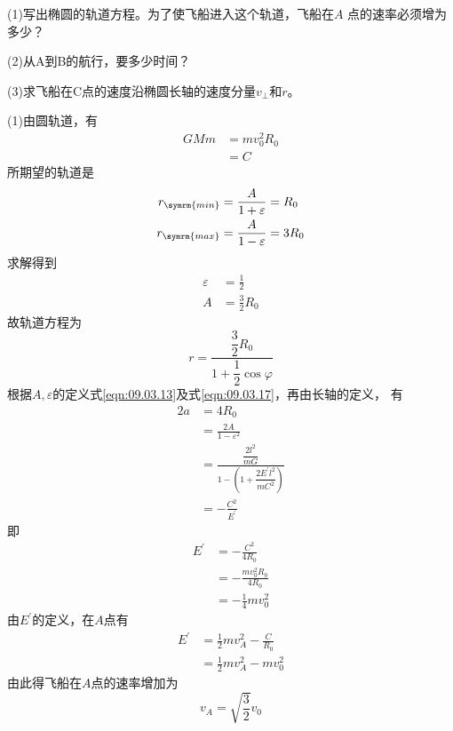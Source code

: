 (1)写出椭圆的轨道方程。为了使飞船进入这个轨道，飞船在$ A $
点的速率必须增为多少？

(2)从A到B的航行，要多少时间？


(3)求飞船在C点的速度沿椭圆长轴的速度分量$ v _ \bot $和$ \dot{ r } $。

\solution (1)由圆轨道，有
\begin{equation*}
  \begin{split}
    G M m &= m v _ 0 ^ { 2 } R _ { 0 } \\
    &= C
  \end{split}
\end{equation*}
所期望的轨道是
\begin{align*}
  r _ { \symrm{ min } } & = \frac { A } { 1 + \varepsilon } = R _ { 0 }   \\
  r _ { \symrm{ max } } & = \frac { A } { 1 - \varepsilon } = 3 R _ { 0 }
\end{align*}
求解得到
\begin{align*}
  \varepsilon & = \frac { 1 } { 2 }           \\
  A           & = \frac { 3 } { 2 } R _ { 0 }
\end{align*}
故轨道方程为
\begin{equation*}
  r = \frac { \dfrac { 3 } { 2 } R _ { 0 } } { 1 + \dfrac { 1 } { 2 } \cos \varphi }
\end{equation*}
根据$ A , \varepsilon $的定义\lhbrak 式\eqref{eqn:09.03.13}及式\eqref{eqn:09.03.17}\rhbrak ，再由长轴的定义，
有
\begin{equation*}
  \begin{split}
    2 a &= 4 R _ { 0 } \\
    &= \frac { 2 A } { 1 - \varepsilon ^ { 2 } } \\
    &= \frac { \dfrac { 2 l ^ { 2 } } { m G } } { 1 - \left( 1 + \dfrac { 2  E ^ { \prime } l ^ { 2 } } { m C ^ { 2 } } \right) }\\
    &= - \frac { C ^ { 2 } } { E ^ { \prime } }
  \end{split}
\end{equation*}
即
\begin{equation*}
  \begin{split}
    E ^ { \prime } &= - \frac { C ^ { 2 } } { 4 R _ { 0 } } \\
    &= - \frac { m v _ 0 ^ { 2 } R _ { 0 } } { 4 R _ { 0 } } \\
    &= - \frac { 1 } { 4 } m v _ { 0 } ^ 2
  \end{split}
\end{equation*}
由$ E ^ { \prime } $的定义，在$ A $点有
\begin{equation*}
  \begin{split}
    E ^ { \prime } &= \frac { 1 } { 2 } m v _ A ^ { 2 } - \frac { C } { R _ { 0 } } \\
    &=  \frac { 1 } { 2 } m v _ A ^ { 2 } - m v _ 0 ^ { 2 }
  \end{split}
\end{equation*}
由此得飞船在$ A $点的速率增加为
\begin{equation*}
  v _ { A } = \sqrt { \frac { 3 } { 2 } } v _ { 0 }
\end{equation*}

